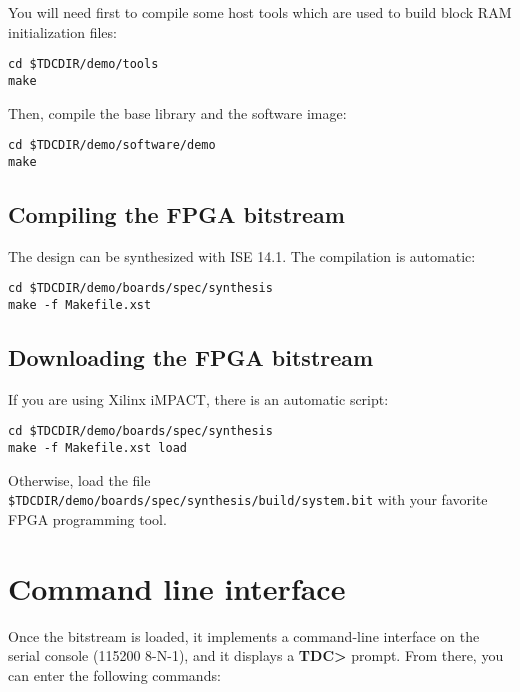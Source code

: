 \documentclass[a4paper,11pt]{article}
\begin{document}
You will need first to compile some host tools which are used to build block RAM initialization files:
\begin{verbatim}
cd $TDCDIR/demo/tools
make
\end{verbatim}

Then, compile the base library and the software image:
\begin{verbatim}
cd $TDCDIR/demo/software/demo
make
\end{verbatim}

\subsection{Compiling the FPGA bitstream}
The design can be synthesized with ISE 14.1. The compilation is automatic:
\begin{verbatim}
cd $TDCDIR/demo/boards/spec/synthesis
make -f Makefile.xst
\end{verbatim}

\subsection{Downloading the FPGA bitstream}
If you are using Xilinx iMPACT, there is an automatic script:
\begin{verbatim}
cd $TDCDIR/demo/boards/spec/synthesis
make -f Makefile.xst load
\end{verbatim}

Otherwise, load the file \verb!$TDCDIR/demo/boards/spec/synthesis/build/system.bit! with your favorite FPGA programming tool.

\section{Command line interface}
Once the bitstream is loaded, it implements a command-line interface on the serial console (115200 8-N-1), and it displays a \textbf{TDC>} prompt. From there, you can enter the following commands:
\end{document}
